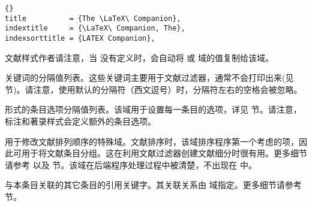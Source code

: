 \begin{fieldlist}
\begin{lstlisting}[style=bibtex]{}
title          = {The \LaTeX\ Companion},
indextitle     = {\LaTeX\ Companion, The},
indexsorttitle = {LATEX Companion},
\end{lstlisting}
%
文献样式作者请注意，当  没有定义时，\biblatex 会自动将  或  域的值复制给该域。



关键词的分隔值列表。这些关键词主要用于文献过滤器，通常不会打印出来(见 节)。请注意，使用默认的分隔符（西文逗号）时，分隔符左右的空格会被忽略。


\keyval 形式的条目选项分隔值列表。该域用于设置每一条目的选项，详见  节。请注意，标注和著录样式会定义额外的条目选项。

用于修改文献排列顺序的特殊域。文献排序时，该域排序程序第一个考虑的项，因此可用于将文献条目分组。这在利用文献过滤器创建文献细分时很有用。更多细节请参考  以及  节。该域在后端程序处理过程中被清楚，不出现在  中。

与本条目关联的其它条目的引用关键字。其关联关系由  域指定。更多细节请参考  节。


\end{fieldlist}

